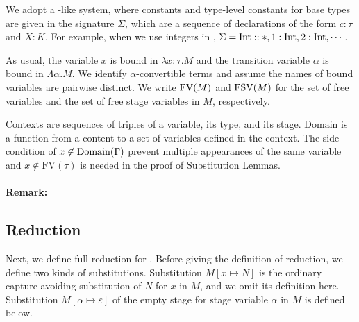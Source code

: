 
We adopt a \LLF-like system, where constants and type-level constants for base types  are given in the signature $\Sigma$, which 
are a sequence of declarations of the form $c:\tau$ and $X:K$.
For example, when we use integers in \LMD, $\Sigma = \textrm{Int} :: *, 1:\textrm{Int}, 2:\textrm{Int}, \cdots$.  

As usual, the variable $x$ is bound in $\lambda x:\tau.M$
and the transition variable $\alpha$ is bound in $\Lambda \alpha.M$.
We identify $\alpha$-convertible terms and assume the names of bound variables are pairwise distinct.
We write $\text{FV}(M)$ and $\text{FSV}(M)$ for the set of free variables and the set of free stage variables in $M$, respectively.

Contexts  are sequences of triples of a variable, its type, and its stage.
$\textrm{Domain}$ is a function from a content to a set of variables defined in the context.
The side condition of $x\not\in\textrm{Domain}(\Gamma)$ prevent multiple appearances of the same variable and
$x\not\in\textrm{FV}(\tau)$ is needed in the proof of Substitution Lemmas.

\paragraph{Remark:}  

\subsection{Reduction}

Next, we define full reduction for \LMD.
Before giving the definition of reduction, we define two kinds of substitutions.
Substitution $M[x\mapsto N]$ is the ordinary capture-avoiding substitution of
$N$ for $x$ in $M$, and we omit its definition here.
Substitution $M[\alpha \mapsto \varepsilon]$ of the empty stage
for stage variable $\alpha$ in $M$ is defined below.


